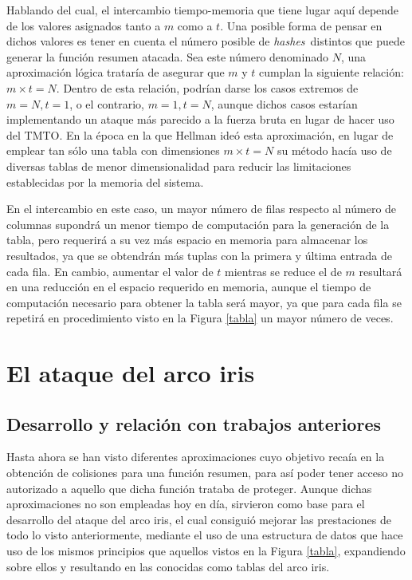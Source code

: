 \documentclass[12pt,spanish,listoffigures,listoftables]{tfgetsinf}
\newcommand{\hashes}{\textit{hashes}}
\begin{document}
Hablando del cual, el intercambio tiempo-memoria que tiene lugar aquí depende de los valores asignados tanto a $m$ como a $t$. Una posible forma de pensar en dichos valores es tener en cuenta el número posible de \hashes~distintos que puede generar la función resumen atacada. Sea este número denominado $N$, una aproximación lógica trataría de asegurar que $m$ y $t$ cumplan la siguiente relación: $m \times t = N$. Dentro de esta relación, podrían darse los casos extremos de $m = N, t = 1$, o el contrario, $m = 1, t = N$, aunque dichos casos estarían implementando un ataque más parecido a la fuerza bruta en lugar de hacer uso del TMTO. En la época en la que Hellman ideó esta aproximación, en lugar de emplear tan sólo una tabla con dimensiones $m \times t = N$ su método hacía uso de diversas tablas de menor dimensionalidad para reducir las limitaciones establecidas por la memoria del sistema.

En el intercambio en este caso, un mayor número de filas respecto al número de columnas supondrá un menor tiempo de computación para la generación de la tabla, pero requerirá a su vez más espacio en memoria para almacenar los resultados, ya que se obtendrán más tuplas con la primera y última entrada de cada fila. En cambio, aumentar el valor de $t$ mientras se reduce el de $m$ resultará en una reducción en el espacio requerido en memoria, aunque el tiempo de computación necesario para obtener la tabla será mayor, ya que para cada fila se repetirá en procedimiento visto en la Figura \ref{tabla} un mayor número de veces. 

\chapter{El ataque del arco iris} \label{ataque}

\section{Desarrollo y relación con trabajos anteriores}

Hasta ahora se han visto diferentes aproximaciones cuyo objetivo recaía en la obtención de colisiones para una función resumen, para así poder tener acceso no autorizado a aquello que dicha función trataba de proteger. Aunque dichas aproximaciones no son empleadas hoy en día, sirvieron como base para el desarrollo del ataque del arco iris, el cual consiguió mejorar las prestaciones de todo lo visto anteriormente, mediante el uso de una estructura de datos que hace uso de los mismos principios que aquellos vistos en la Figura \ref{tabla}, expandiendo sobre ellos y resultando en las conocidas como tablas del arco iris.
\end{document}
